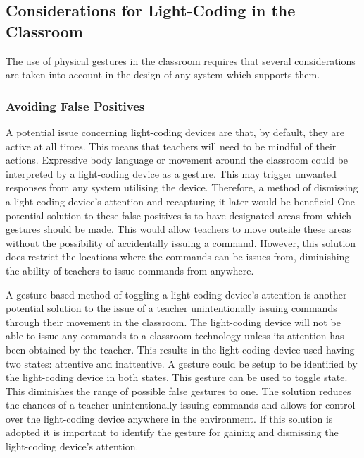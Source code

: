 \documentclass[link]{IWCOMP}
\begin{document}
\subsection{Considerations for Light-Coding in the Classroom}  
\label{subsec:considerations}

The use of physical gestures in the classroom requires that several considerations are taken into account in the design of any system which supports them.

\subsubsection{Avoiding False Positives}  
\label{subsubsec:falsePositives}

A potential issue concerning light-coding devices are that, by default, they are active at all times.
This means that teachers will need to be mindful of their actions.
Expressive body language or movement around the classroom could be interpreted by a light-coding device as a gesture.
This may trigger unwanted responses from any system utilising the device.
Therefore, a method of dismissing a light-coding device's attention and recapturing it later would be beneficial 
One potential solution to these false positives is to have designated areas from which gestures should be made.
This would allow teachers to move outside these areas without the possibility of accidentally issuing a command.
However, this solution does restrict the locations where the commands can be issues from, diminishing the ability of teachers to issue commands from anywhere.

A gesture based method of toggling a light-coding device's attention is another potential solution to the issue of a teacher unintentionally issuing commands through their movement in the classroom.
The light-coding device will not be able to issue any commands to a classroom technology unless its attention has been obtained by the teacher.
This results in the light-coding device used having two states: attentive and inattentive.
A gesture could be setup to be identified by the light-coding device in both states.
This gesture can be used to toggle state.
This diminishes the range of possible false gestures to one.
The solution reduces the chances of a teacher unintentionally issuing commands and allows for control over the light-coding device anywhere in the environment.
If this solution is adopted it is important to identify the gesture for gaining and dismissing the light-coding device's attention.
\end{document}
